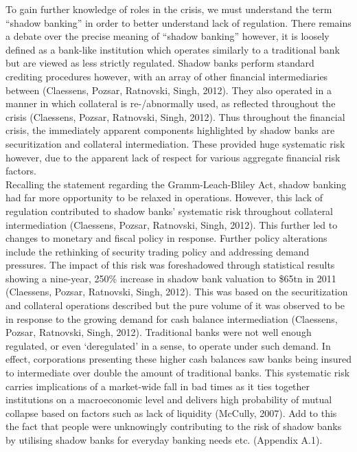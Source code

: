 \documentclass[11pt, english]{article}
\begin{document}
	To gain further knowledge of roles in the crisis, we must understand the term “shadow banking” in order to better understand lack of regulation. There remains a debate over the precise meaning of ``shadow banking'' however, it is loosely defined as a bank-like institution which operates similarly to a traditional bank but are viewed as less strictly regulated. Shadow banks perform standard crediting procedures  however, with an array of other financial intermediaries between (Claessens, Pozsar, Ratnovski, Singh, 2012). They also operated in a manner in which collateral is re-/abnormally used, as reflected throughout the crisis (Claessens, Pozsar, Ratnovski, Singh, 2012). Thus throughout the financial crisis, the immediately apparent components highlighted by shadow banks are securitization and collateral intermediation. These provided huge systematic risk however, due to the apparent lack of respect for various aggregate financial risk factors.\\

	Recalling the statement regarding the Gramm-Leach-Bliley Act, shadow banking had far more opportunity to be relaxed in operations. However, this lack of regulation contributed to shadow banks’ systematic risk throughout collateral intermediation (Claessens, Pozsar, Ratnovski, Singh, 2012). This further led to changes to monetary and fiscal policy in response. Further policy alterations include the rethinking of security trading policy and addressing demand pressures. The impact of this risk was foreshadowed through statistical results showing a nine-year, 250\% increase in shadow bank valuation to \$65tn in 2011 (Claessens, Pozsar, Ratnovski, Singh, 2012). This was based on the securitization and collateral operations described but the pure volume of it was observed to be in response to the growing demand for cash balance intermediation (Claessens, Pozsar, Ratnovski, Singh, 2012). Traditional banks were not well enough regulated, or even ‘deregulated’ in a sense, to operate under such demand. In effect, corporations presenting these higher cash balances saw banks being insured to intermediate over double the amount of traditional banks. This systematic risk carries implications of a market-wide fall in bad times as it ties together institutions on a macroeconomic level and delivers high probability of mutual collapse based on factors such as lack of liquidity (McCully, 2007). Add to this the fact that people were unknowingly contributing to the risk of shadow banks by utilising shadow banks for everyday banking needs etc. (Appendix A.1).\\
\end{document}

